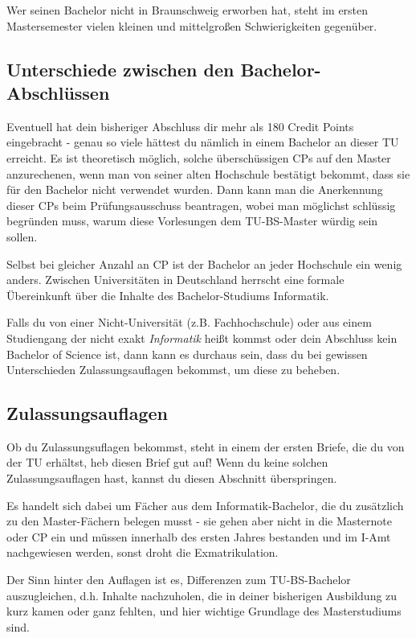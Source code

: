\begin{multicols}{2}
	Wer seinen Bachelor nicht in Braunschweig erworben hat, steht im ersten Mastersemester vielen kleinen und mittelgroßen Schwierigkeiten gegenüber.

	\subsection{Unterschiede zwischen den Bachelor-Abschlüssen}
		Eventuell hat dein bisheriger Abschluss dir mehr als 180 Credit Points eingebracht - genau so viele hättest du nämlich in einem Bachelor an dieser TU erreicht. Es ist theoretisch möglich, solche überschüssigen CPs auf den Master anzurechenen, wenn man von seiner alten Hochschule bestätigt bekommt, dass sie für den Bachelor nicht verwendet wurden. Dann kann man die Anerkennung dieser CPs beim Prüfungsausschuss beantragen, wobei man möglichst schlüssig begründen muss, warum diese Vorlesungen dem TU-BS-Master würdig sein sollen.

		Selbst bei gleicher Anzahl an CP ist der Bachelor an jeder Hochschule ein wenig anders. Zwischen Universitäten in Deutschland herrscht eine formale Übereinkunft über die Inhalte des Bachelor-Studiums Informatik. 

		Falls du von einer Nicht-Universität (z.B. Fachhochschule) oder aus einem Studiengang der nicht exakt \emph{Informatik} heißt kommst oder dein Abschluss kein Bachelor of Science ist, dann kann es durchaus sein, dass du bei gewissen Unterschieden Zulassungsauflagen bekommst, um diese zu beheben.

	\subsection{Zulassungsauflagen}
	\label{auflagen}
	Ob du Zulassungsuflagen bekommst, steht in einem der ersten Briefe, die du von der TU erhältst, heb diesen Brief gut auf! Wenn du keine solchen Zulassungsauflagen hast, kannst du diesen Abschnitt überspringen.

	Es handelt sich dabei um Fächer aus dem Informatik-Bachelor, die du zusätzlich zu den Master-Fächern belegen musst - sie gehen aber nicht in die Masternote oder CP ein und müssen innerhalb des ersten Jahres bestanden und im I-Amt nachgewiesen werden, sonst droht die Exmatrikulation.

	Der Sinn hinter den Auflagen ist es, Differenzen zum TU-BS-Bachelor auszugleichen, d.h. Inhalte nachzuholen, die in deiner bisherigen Ausbildung zu kurz kamen oder ganz fehlten, und hier wichtige Grundlage des Masterstudiums sind.


\end{multicols}
